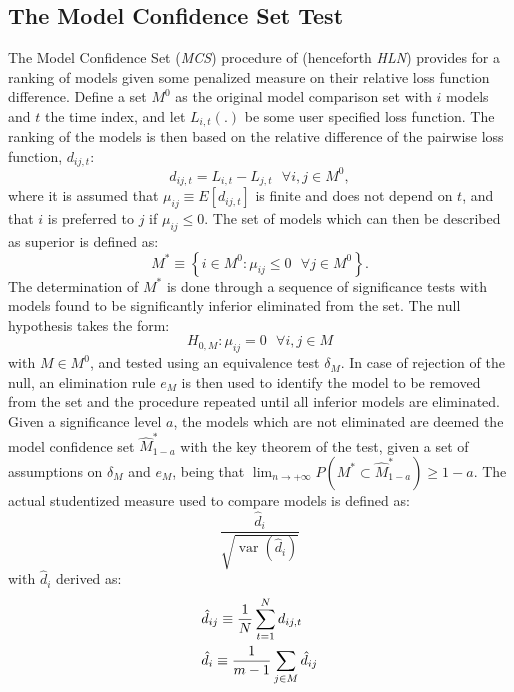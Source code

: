 \subsection{The Model Confidence Set Test}
The Model Confidence Set (\emph{MCS}) procedure of \cite{Hansen2011} (henceforth \emph{HLN}) provides
for a ranking of models given some penalized measure on their relative loss function difference. Define a
set $M^0$ as the original model comparison set with $i$ models and $t$ the time index, and let $L_{i,t}\left(.\right)$ be
some user specified loss function. The ranking of the models is then based on the relative difference of the
pairwise loss function, $d_{ij,t}$:
\begin{equation}\label{mcs1}
{d_{ij,t}} = {L_{i,t}} - {L_{j,t}}{\text{  }}\forall i,j \in {M^0},
\end{equation}
where it is assumed that ${\mu _{ij}} \equiv E\left[ {{d_{ij,t}}} \right]$ is finite and does not depend on $t$, and
that $i$ is preferred to $j$ if $\mu_{ij}\le 0$. The set of models which can then be described as superior is defined as:
\begin{equation}\label{mcs2}
{M^*} \equiv \left\{ {i \in {M^0}:{\mu _{ij}} \leqslant 0{\text{  }}\forall j \in {M^0}} \right\}.
\end{equation}
The determination of $M^*$ is done through a sequence of significance tests with models found to be significantly inferior
eliminated from the set. The null hypothesis takes the form:
\begin{equation}\label{mcs3}
{H_{0,M}}:{\mu _{ij}} = 0{\text{ }}\forall i,j \in M
\end{equation}
with $M \in M^0$, and tested using an equivalence test $\delta_M$. In case of rejection of the null, an elimination
rule $e_M$ is then used to identify the model to be removed from the set and the procedure repeated until all inferior
models are eliminated. Given a significance level $a$, the models which are not eliminated are deemed the model confidence
set $\hat M_{1 - a}^*$ with the key theorem of the test, given a set of assumptions on $\delta_M$ and $e_M$, being
that $\lim_{n \to +\infty}P\left( {{M^*} \subset \hat M_{1 - a}^*} \right) \geqslant 1 - a$. The actual studentized measure
used to compare models is defined as:
\begin{equation}\label{msc4}
\frac{{{{\hat d}_i}}}
{{\sqrt {\operatorname{var} \left( {{{\hat d}_i}} \right)} }}
\end{equation}
with $\hat d_i$ derived as:
\begin{equation}\label{mcs5}
\begin{gathered}
  {{\hat d}_{ij}} \equiv \frac{1}
{N}\sum\limits_{t = 1}^N {{d_{ij,t}}}  \hfill \\
  {{\hat d}_i} \equiv \frac{1}
{{m - 1}}\sum\limits_{j \in M} {{{\hat d}_{ij}}}  \hfill \\
\end{gathered}
\end{equation}
